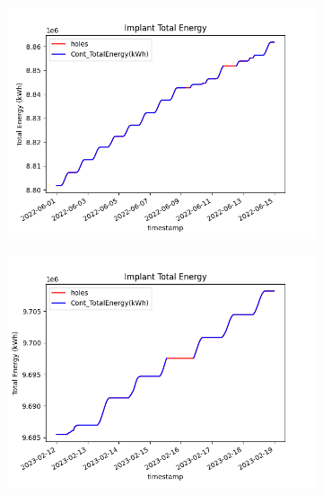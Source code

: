 \begin{figure}[H]
	\centering
	\begin{subfigure}[t]{0.48\textwidth}
		\centering
		\includegraphics[width=\textwidth, keepaspectratio]{chapters/2_data_preprocessing/imgs/totenergybuco1.png}
	\end{subfigure}
	\hspace{0.1cm}
	\begin{subfigure}[t]{0.48\textwidth}
		\centering
		\includegraphics[width=\textwidth, keepaspectratio]{chapters/2_data_preprocessing/imgs/totenergybuco2.png}
	\end{subfigure}\\


\end{figure}
